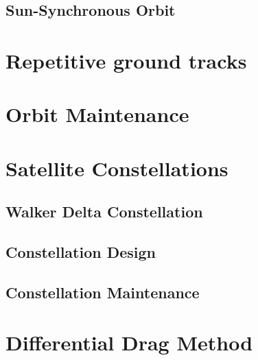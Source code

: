 \subsection{Sun-Synchronous Orbit}



\section{Repetitive ground tracks}


\section{Orbit Maintenance}


\section{Satellite Constellations}
\subsection{Walker Delta Constellation}
\subsection{Constellation Design}
\subsection{Constellation Maintenance}


\section{Differential Drag Method}


